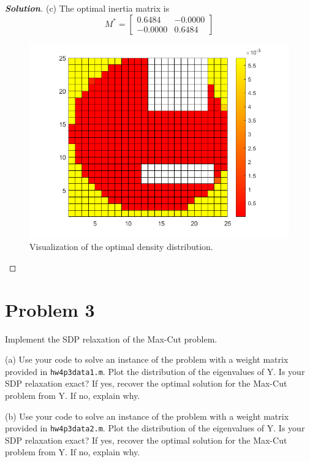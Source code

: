\documentclass[11pt]{article}
\newenvironment{solution}
  {\renewcommand\qedsymbol{$\square$}\begin{proof}[\textbf{Solution}]}
  {\end{proof}}
\begin{document}
\begin{solution}
  (c) The optimal inertia matrix is
  \[
    M^* = \begin{bmatrix}
      0.6484  & -0.0000\\
      -0.0000 &  0.6484
    \end{bmatrix}
  \]
  \begin{figure}[htb]
    \centering
    \includegraphics[width=0.5\columnwidth]{hw4p2.png}
    \caption{Visualization of the optimal density distribution.}
    \label{fig:p2}
  \end{figure}

\end{solution}


\clearpage
\section*{Problem 3}
Implement the SDP relaxation of the Max-Cut problem.

(a) Use your code to solve an instance of the problem with a weight matrix provided in \texttt{hw4p3data1.m}. Plot the distribution of the eigenvalues of Y. Is your SDP relaxation exact? If yes, recover the optimal solution for the Max-Cut problem from Y. If no, explain why.

(b) Use your code to solve an instance of the problem with a weight matrix provided in \texttt{hw4p3data2.m}. Plot the distribution of the eigenvalues of Y. Is your SDP relaxation exact? If yes, recover the optimal solution for the Max-Cut problem from Y. If no, explain why.
\end{document}
